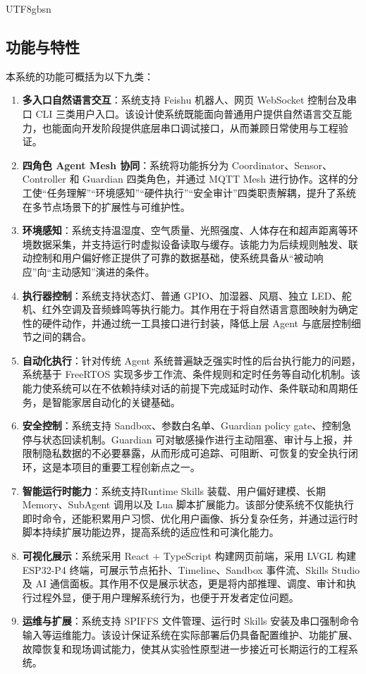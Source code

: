\documentclass[a4paper,12pt]{article}
\begin{document}
\begin{CJK*}{UTF8}{gbsn}
\subsection{功能与特性}
本系统的功能可概括为以下九类：
\begin{enumerate}
  \item \textbf{多入口自然语言交互}：系统支持 Feishu 机器人、网页 WebSocket 控制台及串口 CLI 三类用户入口。该设计使系统既能面向普通用户提供自然语言交互能力，也能面向开发阶段提供底层串口调试接口，从而兼顾日常使用与工程验证。
  \item \textbf{四角色 Agent Mesh 协同}：系统将功能拆分为 Coordinator、Sensor、Controller 和 Guardian 四类角色，并通过 MQTT Mesh 进行协作。这样的分工使“任务理解”“环境感知”“硬件执行”“安全审计”四类职责解耦，提升了系统在多节点场景下的扩展性与可维护性。
  \item \textbf{环境感知}：系统支持温湿度、空气质量、光照强度、人体存在和超声距离等环境数据采集，并支持运行时虚拟设备读取与缓存。该能力为后续规则触发、联动控制和用户偏好修正提供了可靠的数据基础，使系统具备从“被动响应”向“主动感知”演进的条件。
  \item \textbf{执行器控制}：系统支持状态灯、普通 GPIO、加湿器、风扇、独立 LED、舵机、红外空调及音频蜂鸣等执行能力。其作用在于将自然语言意图映射为确定性的硬件动作，并通过统一工具接口进行封装，降低上层 Agent 与底层控制细节之间的耦合。
  \item \textbf{自动化执行}：针对传统 Agent 系统普遍缺乏强实时性的后台执行能力的问题，系统基于 FreeRTOS 实现多步工作流、条件规则和定时任务等自动化机制。该能力使系统可以在不依赖持续对话的前提下完成延时动作、条件联动和周期任务，是智能家居自动化的关键基础。
  \item \textbf{安全控制}：系统支持 Sandbox、参数白名单、Guardian policy gate、控制急停与状态回读机制。Guardian 可对敏感操作进行主动阻塞、审计与上报，并限制隐私数据的不必要暴露，从而形成可追踪、可阻断、可恢复的安全执行闭环，这是本项目的重要工程创新点之一。
  \item \textbf{智能运行时能力}：系统支持Runtime Skills 装载、用户偏好建模、长期 Memory、SubAgent 调用以及 Lua 脚本扩展能力。该部分使系统不仅能执行即时命令，还能积累用户习惯、优化用户画像、拆分复杂任务，并通过运行时脚本持续扩展功能边界，提高系统的适应性和可演化能力。
  \item \textbf{可视化展示}：系统采用 React + TypeScript 构建网页前端，采用 LVGL 构建 ESP32-P4 终端，可展示节点拓扑、Timeline、Sandbox 事件流、Skills Studio 及 AI 通信面板。其作用不仅是展示状态，更是将内部推理、调度、审计和执行过程外显，便于用户理解系统行为，也便于开发者定位问题。
  \item \textbf{运维与扩展}：系统支持 SPIFFS 文件管理、运行时 Skills 安装及串口强制命令输入等运维能力。该设计保证系统在实际部署后仍具备配置维护、功能扩展、故障恢复和现场调试能力，使其从实验性原型进一步接近可长期运行的工程系统。
\end{enumerate}


\end{CJK*}
\end{document}

